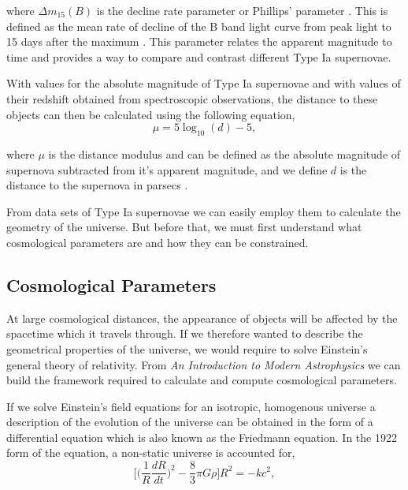 \documentclass[twocolumn]{revtex4}
\begin{document}
where $\Delta m_{15}(B)$ is the decline rate parameter or Phillips' parameter \cite{high_en_astro}. This is defined as the mean rate of decline of the B band light curve from peak light to 15 days after the maximum \cite{abs_phil}. This parameter relates the apparent magnitude to time and provides a way to compare and contrast different Type Ia supernovae. 

With values for the absolute magnitude of Type Ia supernovae and with values of their redshift obtained from spectroscopic observations, the distance to these objects can then be calculated using the following equation, 
\begin{equation}
\mu = 5 \log_{10}(d) - 5,
\end{equation}

where $\mu$ is the distance modulus and can be defined as the absolute magnitude of supernova subtracted from it's apparent magnitude, and we define $d$ is the distance to the supernova in parsecs \cite{mod_ast}. 

From data sets of Type Ia supernovae we can easily employ them to calculate the geometry of the universe. But before that, we must first understand what cosmological parameters are and how they can be constrained.

\vspace{-3ex}
\subsection{Cosmological Parameters}
\label{sec:cosmo_parameters}
\vspace{-2ex}
At large cosmological distances, the appearance of objects will be affected by the spacetime which it travels through. If we therefore wanted to describe the geometrical properties of the universe, we would require to solve Einstein's general theory of relativity. From \textit{An Introduction to Modern Astrophysics} \cite{mod_ast} we can build the framework required to calculate and compute cosmological parameters. 

If we solve Einstein's field equations for an isotropic, homogenous universe a description of the evolution of the universe can be obtained in the form of a differential equation which is also known as the Friedmann equation. In the 1922 form of the equation, a non-static universe is accounted for,
\begin{equation}
\Big[ \Big( \frac{1}{R} \frac{dR}{dt} \Big)^2 - \frac{8}{3} \pi G \rho \Big] R^2 = -k c^2,
\label{eqn:1922_friedmann}
\end{equation}
\end{document}
